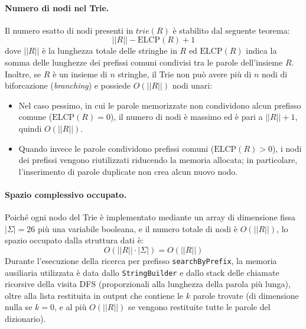 \documentclass[11pt,a4paper]{article}
\begin{document}
\paragraph{Numero di nodi nel Trie.}
Il numero esatto di nodi presenti in $trie(R)$ è stabilito dal seguente teorema:
\[
    ||R|| - \text{ELCP}(R) + 1
\]
dove $||R||$ è la lunghezza totale delle stringhe in $R$ ed $\text{ELCP}(R)$ indica la somma delle lunghezze dei prefissi comuni condivisi tra le parole dell'insieme $R$.
Inoltre, se $R$ è un insieme di $n$ stringhe, il Trie non può avere più di $n$ nodi di biforcazione (\emph{branching}) e possiede $O(||R||)$ nodi unari:
\begin{itemize}
    \item Nel caso pessimo, in cui le parole memorizzate non condividono alcun prefisso comune ($\text{ELCP}(R) = 0$), il numero di nodi è massimo ed è pari a $||R|| + 1$, quindi $O(||R||)$.
    \item Quando invece le parole condividono prefissi comuni ($\text{ELCP}(R) > 0$), i nodi dei prefissi vengono riutilizzati riducendo la memoria allocata; in particolare, l'inserimento di parole duplicate non crea alcun nuovo nodo.
\end{itemize}

\paragraph{Spazio complessivo occupato.}
Poiché ogni nodo del Trie è implementato mediante un array di dimensione fissa $|\Sigma| = 26$ più una variabile booleana, e il numero totale di nodi è $O(||R||)$, lo spazio occupato dalla struttura dati è:
\[
    O(||R|| \cdot |\Sigma|) = O(||R||)
\]
Durante l'esecuzione della ricerca per prefisso \texttt{searchByPrefix}, la memoria ausiliaria utilizzata è data dallo \texttt{StringBuilder} e dallo stack delle chiamate ricorsive della visita DFS (proporzionali alla lunghezza della parola più lunga), oltre alla lista restituita in output che contiene le $k$ parole trovate (di dimensione nulla se $k = 0$, e al più $O(||R||)$ se vengono restituite tutte le parole del dizionario).
\end{document}
